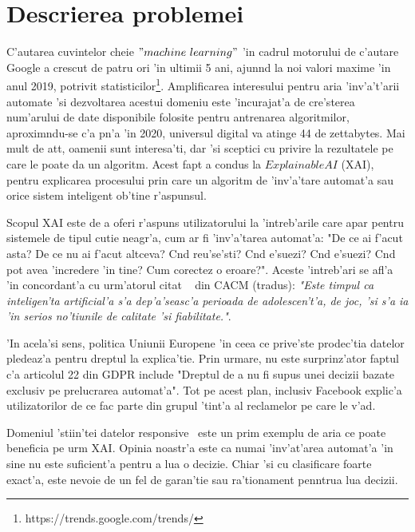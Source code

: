 \documentclass[12pt,a4paper,twoside]{report}
\begin{document}
\section{Descrierea problemei}

C'autarea cuvintelor cheie $"machine\ learning"$ 'in cadrul motorului de c'autare Google a crescut de patru ori 'in ultimii 5 ani, ajun\ia nd la noi valori maxime 'in anul 2019, potrivit statisticilor\footnote{https://trends.google.com/trends/}. Amplificarea interesului pentru aria 'inv'a't'arii automate 'si dezvoltarea acestui domeniu este 'incurajat'a de cre'sterea num'arului de date disponibile folosite pentru antrenarea algoritmilor, aproxim\ia ndu-se c'a p\ia n'a 'in 2020, universul digital va atinge 44 de zettabytes. Mai mult de at\ia t, oamenii sunt interesa'ti, dar 'si sceptici cu privire la rezultatele pe care le poate da un algoritm. Acest fapt a condus la $Explainable AI$ (XAI), pentru explicarea procesului prin care un algoritm de 'inv'a'tare automat'a sau orice sistem inteligent ob'tine r'aspunsul.

Scopul XAI este de a oferi r'aspuns utilizatorului la 'intreb'arile care apar pentru sistemele de tipul cutie neagr'a, cum ar fi 'inv'a'tarea automat'a: "De ce ai f'acut asta? De ce nu ai f'acut altceva? C\ia nd reu'se'sti? C\ia nd e'suezi? C\ia nd e'suezi? C\ia nd pot avea 'incredere 'in tine? Cum corectez o eroare?". Aceste 'intreb'ari se afl'a 'in concordant'a cu urm'atorul citat ~\cite{monroe2018ai} din CACM (tradus): {\it "Este timpul ca inteligen'ta artificial'a s'a dep'a'seasc'a perioada de adolescen't'a, de joc, 'si s'a ia 'in serios no'tiunile de calitate 'si fiabilitate."}.

'In acela'si sens, politica Uniunii Europene 'in ceea ce prive'ste prodec'tia datelor pledeaz'a pentru dreptul la explica'tie. Prin urmare, nu este surprinz'ator faptul c'a articolul 22 din GDPR include "Dreptul de a nu fi supus unei decizii bazate exclusiv pe prelucrarea automat'a". Tot pe acest plan, inclusiv Facebook explic'a utilizatorilor de ce fac parte din grupul 'tint'a al reclamelor pe care le v'ad. 

Domeniul 'stiin'tei datelor responsive~\cite{van2017responsible} este un prim exemplu de aria ce poate beneficia pe urm XAI. Opinia noastr'a este ca numai 'inv'at'area automat'a 'in sine nu este suficient'a pentru a lua o decizie. Chiar 'si cu clasificare foarte exact'a, este nevoie de un fel de garan'tie sau ra'tionament penntrua lua decizii.
\end{document}
